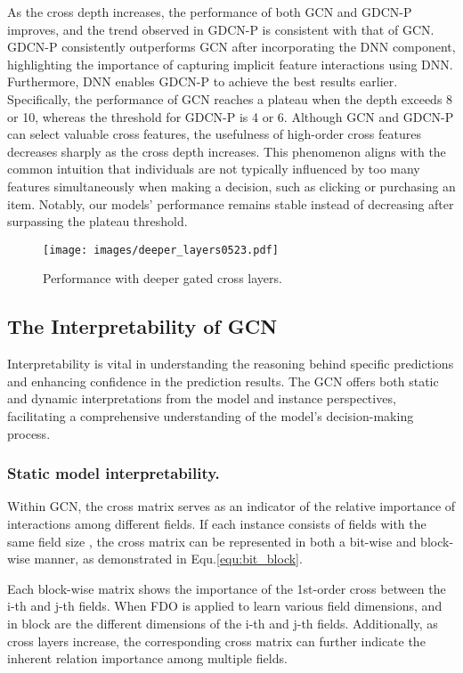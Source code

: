 \documentclass[sigconf]{acmart}
\begin{document}
As the cross depth increases, the performance of both GCN and GDCN-P improves, and the trend observed in GDCN-P is consistent with that of GCN. GDCN-P consistently outperforms GCN after incorporating the DNN component, highlighting the importance of capturing implicit feature interactions using DNN. Furthermore, DNN enables GDCN-P to achieve the best results earlier. Specifically, the performance of GCN reaches a plateau when the depth exceeds 8 or 10, whereas the threshold for GDCN-P is 4 or 6. Although GCN and GDCN-P can select valuable cross features, the usefulness of high-order cross features decreases sharply as the cross depth increases. This phenomenon aligns with the common intuition that individuals are not typically influenced by too many features simultaneously when making a decision, such as clicking or purchasing an item. Notably, our models' performance remains stable instead of decreasing after surpassing the plateau threshold.

\begin{figure}[t]
\setlength{\abovecaptionskip}{0.2cm}
\setlength{\belowcaptionskip}{-0.2cm}
\centering
\texttt{[image: images/deeper\_layers0523.pdf]}
\caption{Performance with deeper gated cross layers.} 
\label{fig:deeper_layers}
\end{figure}



\subsection{The Interpretability of GCN}

Interpretability is vital in understanding the reasoning behind specific predictions and enhancing confidence in the prediction results. The GCN offers both static and dynamic interpretations from the model and instance perspectives, facilitating a comprehensive understanding of the model's decision-making process.
 

\subsubsection{Static model interpretability.}
Within GCN, the cross matrix  serves as an indicator of the relative importance of interactions among different fields. If each instance consists of  fields with the same field size , the cross matrix can be represented in both a bit-wise and block-wise manner, as demonstrated in Equ.\ref{equ:bit_block}.

Each block-wise matrix  shows the importance of the 1st-order cross between the i-th and j-th fields. When FDO is applied to learn various field dimensions,  and  in block  are the different dimensions of the i-th and j-th fields. Additionally, as cross layers increase, the corresponding cross matrix can further indicate the inherent relation importance among multiple fields. 
\end{document}
